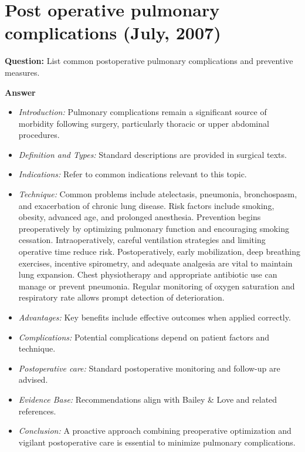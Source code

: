 \documentclass{article}
\begin{document}
\section{Post operative pulmonary complications (July, 2007)}

\textbf{Question:} List common postoperative pulmonary complications and preventive measures.

\textbf{Answer}
\begin{itemize}

\item \emph{Introduction:} Pulmonary complications remain a significant source of morbidity following surgery, particularly thoracic or upper abdominal procedures.
\item \emph{Definition and Types:} Standard descriptions are provided in surgical texts.
\item \emph{Indications:} Refer to common indications relevant to this topic.

\item \emph{Technique:} Common problems include atelectasis, pneumonia, bronchospasm, and exacerbation of chronic lung disease. Risk factors include smoking, obesity, advanced age, and prolonged anesthesia. Prevention begins preoperatively by optimizing pulmonary function and encouraging smoking cessation. Intraoperatively, careful ventilation strategies and limiting operative time reduce risk. Postoperatively, early mobilization, deep breathing exercises, incentive spirometry, and adequate analgesia are vital to maintain lung expansion. Chest physiotherapy and appropriate antibiotic use can manage or prevent pneumonia. Regular monitoring of oxygen saturation and respiratory rate allows prompt detection of deterioration.
\item \emph{Advantages:} Key benefits include effective outcomes when applied correctly.
\item \emph{Complications:} Potential complications depend on patient factors and technique.
\item \emph{Postoperative care:} Standard postoperative monitoring and follow-up are advised.
\item \emph{Evidence Base:} Recommendations align with Bailey \& Love and related references.

\item \emph{Conclusion:} A proactive approach combining preoperative optimization and vigilant postoperative care is essential to minimize pulmonary complications.


\end{itemize}
\end{document}
